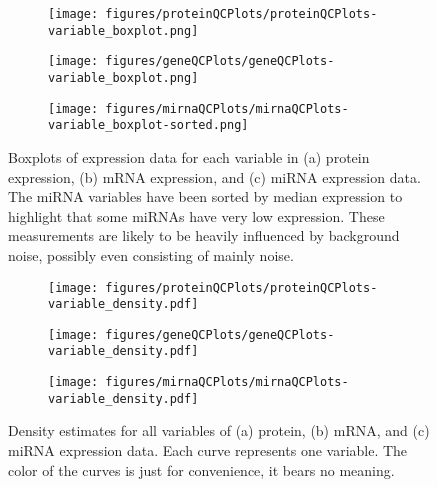 \begin{figure}
	\centering
	\begin{subfigure}{1\textwidth}
		\centering
		\texttt{[image: figures/proteinQCPlots/proteinQCPlots-variable\_boxplot.png]}
	\end{subfigure}
	\begin{subfigure}{1\textwidth}
		\centering
		\texttt{[image: figures/geneQCPlots/geneQCPlots-variable\_boxplot.png]}
	\end{subfigure}
	\begin{subfigure}{1\textwidth}
		\centering
		\texttt{[image: figures/mirnaQCPlots/mirnaQCPlots-variable\_boxplot-sorted.png]}
	\end{subfigure}%
	\caption{Boxplots of expression data for each variable in
	(a) protein expression, (b) mRNA expression, and (c) miRNA expression data.
	The miRNA variables have been sorted by median expression to highlight that
	some miRNAs have very low expression. These measurements are likely to
	be heavily influenced by background noise, possibly even consisting of
	mainly noise.}
	\label{fig:test}
\end{figure}


\begin{figure}[!h]
	\centering
	\begin{subfigure}{.32\textwidth}
		\centering
		\texttt{[image: figures/proteinQCPlots/proteinQCPlots-variable\_density.pdf]}
		\subcaption{\label{fig:protein-sample-pca}}
	\end{subfigure}
	\begin{subfigure}{.32\textwidth}
		\centering
		\texttt{[image: figures/geneQCPlots/geneQCPlots-variable\_density.pdf]}
		\subcaption{\label{fig:gene-sample-pca}}
	\end{subfigure}
	\begin{subfigure}{.32\textwidth}
		\centering
		\texttt{[image: figures/mirnaQCPlots/mirnaQCPlots-variable\_density.pdf]}
		\subcaption{\label{fig:mirna-sample-pca}}
	\end{subfigure}%
	\caption{Density estimates for all variables of (a) protein, (b) mRNA, and (c) miRNA expression data.
	Each curve represents one variable. The color of the curves is just for convenience, it bears
	no meaning.}
	\label{fig:test}
\end{figure}
